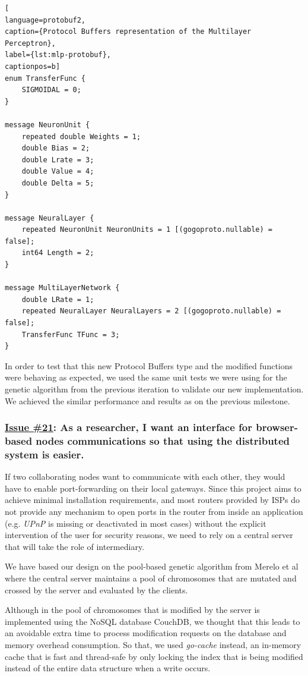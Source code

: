 \begin{lstlisting}[
language=protobuf2,
caption={Protocol Buffers representation of the Multilayer Perceptron},
label={lst:mlp-protobuf},
captionpos=b]
enum TransferFunc {
    SIGMOIDAL = 0;
}

message NeuronUnit {
    repeated double Weights = 1;
    double Bias = 2;
    double Lrate = 3;
    double Value = 4;
    double Delta = 5;
}

message NeuralLayer {
    repeated NeuronUnit NeuronUnits = 1 [(gogoproto.nullable) = false];
    int64 Length = 2;
}

message MultiLayerNetwork {
    double LRate = 1;
    repeated NeuralLayer NeuralLayers = 2 [(gogoproto.nullable) = false];
    TransferFunc TFunc = 3;
}
\end{lstlisting} 

In order to test that this new Protocol Buffers type and the modified functions were behaving as expected, we used the same unit tests we were using for the genetic algorithm from the previous iteration to validate our new implementation. We achieved the similar performance and results as on the previous milestone.

\subsubsection*{\href{https://github.com/salvacorts/TFG-Parasitic-Metaheuristics/issues/21}{Issue \#21}: As a researcher, I want an interface for browser-based nodes communications so that using the distributed system is easier.}

If two collaborating nodes want to communicate with each other, they would have to enable port-forwarding on their local gateways. Since this project aims to achieve minimal installation requirements, and most routers provided by ISPs do not provide any mechanism to open ports in the router from inside an application (e.g. \textit{UPnP} \cite{wiki-upnp} is missing or deactivated in most cases) without the explicit intervention of the user for security reasons, we need to rely on a central server that will take the role of intermediary.

We have based our design on the pool-based genetic algorithm from Merelo et al \cite{paper-pool-jj} where the central server maintains a pool of chromosomes that are mutated and crossed by the server and evaluated by the clients.

Although in \cite{paper-pool-jj} the pool of chromosomes that is modified by the server is implemented using the NoSQL database CouchDB, we thought that this leads to an avoidable extra time to process modification requests on the database and memory overhead consumption. So that, we used \textit{go-cache} \cite{go-cache} instead, an in-memory cache that is fast and thread-safe by only locking the index that is being modified instead of the entire data structure when a write occurs.

